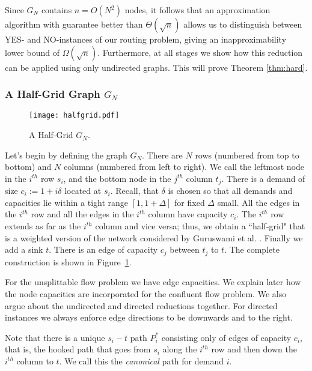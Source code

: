 \documentclass[12pt]{article}
\newcommand{\capp}[1]{c_{#1}}
\begin{document}
Since $G_N$ contains $n=O(N^2)$ nodes, it follows that an approximation algorithm with guarantee better than
$\Theta(\sqrt{n})$  allows us to distinguish between YES- and NO-instances of our
routing problem, giving an inapproximability lower bound of $\Omega(\sqrt n)$.
Furthermore, at all stages we  show how this reduction can be applied using
only undirected graphs.  This will prove Theorem \ref{thm:hard}.



\subsubsection{A Half-Grid Graph $G_N$}

\begin{figure}[th]
\begin{center}
\texttt{[image: halfgrid.pdf]}
\caption{\label{fig.grid} A Half-Grid $G_N$.}
\end{center}
\end{figure}


Let's begin by defining the graph $G_N$.  There are $N$ rows (numbered from
top to bottom) and $N$ columns (numbered from left to right). We call the leftmost node in the $i^{th}$ row $s_i$, and
the bottom node in the $j^{th}$ column $t_j$. There is a demand of size $\capp{i} := 1+i\delta$  located at $s_i$.
Recall, that $\delta$ is chosen so that all demands and capacities
lie within a tight range $[1,1+\Delta]$ for fixed $\Delta$ small. All the edges
in the $i^{th}$ row and all the edges in the $i^{th}$ column have capacity
$\capp{i}$.  The $i^{th}$ row extends as far as the $i^{th}$ column and vice
versa; thus, we obtain a ``half-grid" that is a weighted version of the
network considered by Guruswami et al. \cite{guruswami2003near}.  Finally we add a sink $t$.
There is an edge of capacity $\capp{j}$ between $t_j$ to $t$. The
complete construction is shown in Figure~\ref{fig.grid}.

For the unsplittable flow problem we have edge capacities. We explain later how the node capacities
are incorporated for the confluent flow problem. We also argue about the undirected and directed reductions together.
For directed instances we always enforce  edge directions to be downwards
and to the right.


Note that there is a unique $s_i-t$ path $P^*_i$ consisting only of edges of
capacity $\capp{i}$, that is, the hooked path that goes from $s_i$ along the
$i^{th}$ row and then down the $i^{th}$ column to $t$. We call this the {\em canonical} path
for demand $i$.
\end{document}
